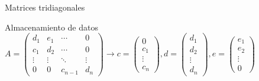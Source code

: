 \documentclass [8pt] {beamer}
\begin{document}
        \begin{frame}{Matrices tridiagonales}
            \begin{block}{Almacenamiento de datos}
                $A = \left( \begin{array}{llll}
                d_1 & e_1 & \cdots & 0 \\
                c_1 & d_2 & \cdots & 0 \\
                \vdots & \vdots & \ddots & \vdots\\
                0 & 0 & c_{n - 1} & d_n
                \end{array} \right) \rightarrow c = \left( \begin{array}{c}
                0\\ c_1\\ \vdots\\ c_n
                \end{array} \right), d = \left( \begin{array}{c}
                d_1\\ d_2\\ \vdots \\ d_n
                \end{array} \right), e = \left( \begin{array}{c}
                e_1\\ e_2\\ \vdots \\ 0
                \end{array} \right)$
            \end{block}
\end{frame}
\end{document}

